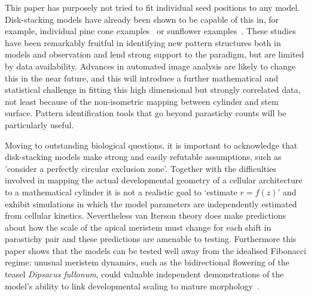 \documentclass[a4paper,10pt]{amsart}
\begin{document}
This paper has purposely not tried to fit individual seed positions to any model.  Disk-stacking models have already been shown to be capable of this in, for example, individual pine cone examples~\cite{douadyFibonacciQuasisymmetricPhyllotaxis2016} or sunflower examples~\cite{hottonPossibleActualPhyllotaxis2006}. These studies have been remarkably fruitful in identifying new pattern structures both in models and observation and lend strong support to the paradigm, but are limited by data availability.  Advances in automated image analysis are likely to change this in the near future, and this will introduce a further mathematical and statistical challenge in fitting this high dimensional but strongly correlated data, not least because of the non-isometric mapping between cylinder and stem surface. Pattern identification tools that go beyond parastichy counts will be particularly useful.


Moving to outstanding biological questions, it is important 
to acknowledge that disk-stacking models make strong and easily refutable assumptions, such as 'consider a perfectly circular exclusion zone'. Together with the difficulties involved in mapping the actual developmental geometry of a cellular architecture to a mathematical cylinder it is not a realistic goal to `estimate $r=f(z)$' and exhibit simulations in which the model parameters are independently estimated from cellular kinetics. Nevertheless van Iterson theory does make predictions about how the scale of the apical meristem must change for each shift in parastichy pair and these predictions are amenable to testing. Furthermore this paper shows that the models can be tested well away from the idealised Fibonacci regime: unusual meristem dynamics, such as the bidirectional flowering of the teasel \textit{Dipsacus fullonum}, could  valuable independent demonstrations of the model's ability to link developmental scaling to mature morphology~\cite{naghilooUnderstandingUniqueFlowering2017}.
\end{document}

